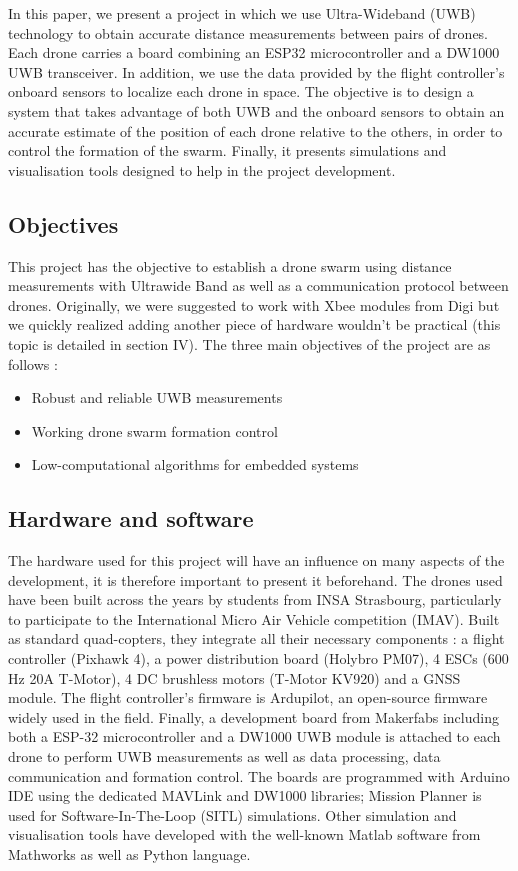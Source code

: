 \documentclass[conference]{IEEEtran}
\begin{document}
In this paper, we present a project in which  we use Ultra-Wideband (UWB) technology to obtain accurate distance measurements between pairs of drones. Each drone carries a board combining an ESP32 microcontroller and a DW1000 UWB transceiver. In addition, we use the data provided by the flight controller’s onboard sensors to localize each drone in space. The objective is to design a system that takes advantage of both UWB and the onboard sensors to obtain an accurate estimate of the position of each drone relative to the others, in order to control the formation of the swarm. Finally, it presents simulations and visualisation tools designed to help in the project development.

\subsection{Objectives}
This project has the objective to establish a drone swarm using distance measurements with Ultrawide Band as well as a communication protocol between drones. Originally, we were suggested to work with Xbee modules from Digi but we quickly realized adding another piece of hardware wouldn't be practical (this topic is detailed in section IV). The three main objectives of the project are as follows : 

\begin{itemize}
    \item Robust and reliable UWB measurements
    \item Working drone swarm formation control
    \item Low-computational algorithms for embedded systems
\end{itemize}

\subsection{Hardware and software}

The hardware used for this project will have an influence on many aspects of the development, it is therefore important to present it beforehand. The drones used have been built across the years by students from INSA Strasbourg, particularly to participate to the International Micro Air Vehicle competition (IMAV). Built as standard quad-copters, they integrate all their necessary components : a flight controller (Pixhawk 4), a power distribution board (Holybro PM07), 4 ESCs (600 Hz 20A T-Motor), 4 DC brushless motors (T-Motor KV920) and a GNSS module. The flight controller's firmware is Ardupilot, an open-source firmware widely used in the field. Finally, a development board from Makerfabs including both a ESP-32 microcontroller and a DW1000 UWB module is attached to each drone to perform UWB measurements as well as data processing, data communication and formation control. The boards are programmed with Arduino IDE using the dedicated MAVLink and DW1000 libraries; Mission Planner is used for Software-In-The-Loop (SITL) simulations. Other simulation and visualisation tools have developed with the well-known Matlab software from Mathworks as well as Python language. 
\end{document}
